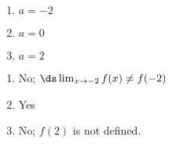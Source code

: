 {\begin{enumerate}
\item		$a = -2$
\item		$a=0$
\item		$a=2$
\end{enumerate}

}
{\begin{enumerate}
\item		No; $\ds \lim_{x\to -2}f(x) \neq f(-2)$
\item		Yes
\item		No; $f(2)$ is not defined.
\end{enumerate}
}
